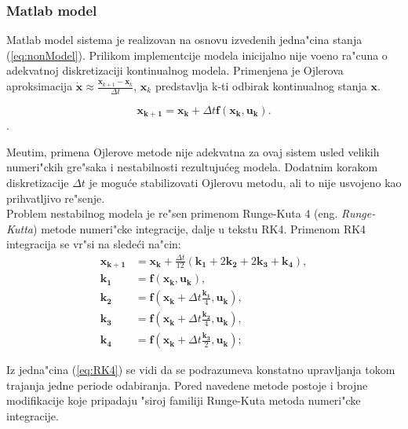 \documentclass[a4paper,11pt]{article}
\theoremstyle{definition} \newtheorem{deff}{Definicija}[section]
\theoremstyle{definition} \newtheorem{prim}[deff]{Primer}
\theoremstyle{plain} \newtheorem{teor}[deff]{Teorema}
\newcommand{\vect}[1]{\boldsymbol{\mathbf{#1}}}
\begin{document}
	
	
	\clearpage
	
	\subsubsection{Matlab model}\label{sec:matlab_model}
	
	Matlab model sistema je realizovan na osnovu izvedenih jedna"cina stanja (\ref{eq:nonModel}). Prilikom implementcije modela inicijalno nije vo\dj eno ra"cuna o adekvatnoj diskretizaciji kontinualnog modela. Primenjena je Ojlerova aproksimacija $\dot{\mathbf{x}} \approx \frac{\mathbf{x}_{k+1} - \mathbf{x}_{k}}{\Delta t}$, $\mathbf{x}_{k}$ predstavlja k-ti odbirak kontinualnog stanja $\mathbf{x}$.
	
	\begin{equation} \label{eq:Ojler}
		\vect{x_{k+1}} = \vect{x_{k}} + \Delta t \vect{f}(\vect{x_k}, \vect{u_k}).
	\end{equation}.
	
	Me\dj utim, primena Ojlerove metode nije adekvatna za ovaj sistem usled velikih numeri"ckih gre"saka i nestabilnosti rezultuju\'ceg modela. Dodatnim korakom diskretizacije $\Delta t$ je mogu\'ce stabilizovati Ojlerovu metodu, ali to nije usvojeno kao prihvatljivo re"senje.\\
	
	Problem nestabilnog modela je re"sen primenom Runge-Kuta 4 (eng. \textit{Runge-Kutta}) metode numeri"cke integracije, dalje u tekstu RK4. Primenom RK4 integracija se vr"si na slede\'ci na"cin: 
	\begin{align} \label{eq:RK4}
		\vect{x_{k+1}} &= \vect{x_k} + \frac{\Delta t}{12}(\vect{k_1} + 2\vect{k_2}
			+ 2\vect{k_3} + \vect{k_4}), \\			
		\vect{k_1} &= \vect{f}(\vect{x_k}, \vect{u_k}), \\
		\vect{k_2} &= \vect{f}(\vect{x_k} + \Delta t \frac{\vect{k_1}}{4}, \vect{u_k}), \\
		\vect{k_3} &= \vect{f}(\vect{x_k} + \Delta t \frac{\vect{k_2}}{4}, \vect{u_k}), \\
		\vect{k_4} &= \vect{f}(\vect{x_k} +  \Delta t \frac{\vect{k_3}}{2}, \vect{u_k});		
	\end{align}
	
	Iz jedna"cina (\ref{eq:RK4}) se vidi da se podrazumeva konstatno upravljanja tokom trajanja jedne periode odabiranja. Pored navedene metode postoje i brojne modifikacije koje pripadaju "siroj familiji Runge-Kuta metoda numeri"cke integracije. \\
	
\end{document}
